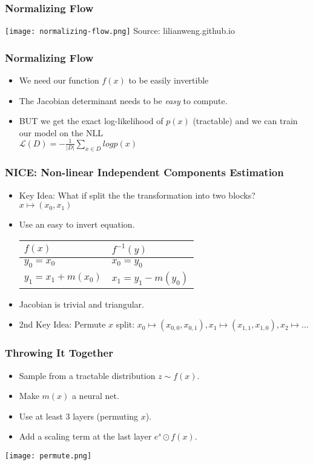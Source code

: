 \begin{frame}
    \frametitle{Normalizing Flow}
    \center\texttt{[image: normalizing-flow.png]}
    \tiny{Source: lilianweng.github.io}
\end{frame}

\begin{frame}
    \frametitle{Normalizing Flow}
    \begin{itemize}
        \item We need our function $f(x)$ to be easily invertible
        \item The Jacobian determinant needs to be \textit{easy} to compute.
        \item BUT we get the exact log-likelihood of $p(x)$ (tractable) and we
            can train our model on the NLL \\$\mathcal{L}(D) = -\frac{1}{|D|}
            \sum\limits_{x\in D} log{p(x)}$
    \end{itemize}
\end{frame}

\begin{frame}
    \frametitle{NICE: Non-linear Independent Components Estimation}
    \begin{itemize}
        \item<1-> Key Idea: What if split the the transformation into two
            blocks? $x \mapsto (x_0, x_1)$
        \item<2-> Use an easy to invert equation.\\
            \begin{tabular}{|l|l|}
                \hline
                $f(x)$ & $f^{-1}(y)$\\
                \hline
                $y_0 = x_0$ & $x_0 = y_0$\\
                $y_1 = x_1 + m(x_0)$ & $x_1 = y_1 - m(y_0)$
                \\\hline
            \end{tabular}
        \item<3->Jacobian is trivial and triangular.
        \item<4->2nd Key Idea: Permute $x$ split: $x_0 \mapsto (x_{0,0}, x_{0,1}), x_1
            \mapsto (x_{1,1}, x_{1,0}), x_2 \mapsto...$
    \end{itemize}
\end{frame}

\begin{frame}
    \frametitle{Throwing It Together}
    \begin{itemize}
        \item Sample from a tractable distribution $z\sim f(x)$.
        \item Make $m(x)$ a neural net.
        \item Use at least 3 layers (permuting $x$).
        \item Add a scaling term at the last layer $e^s\odot f(x)$.
    \end{itemize}
    \center\texttt{[image: permute.png]}
\end{frame}

